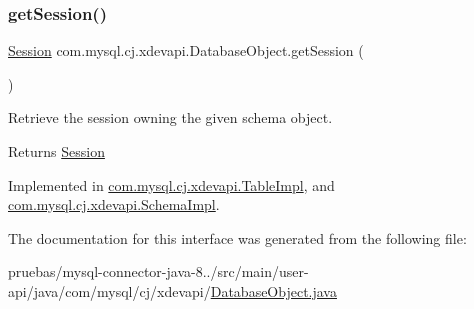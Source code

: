 \mbox{\label{interfacecom_1_1mysql_1_1cj_1_1xdevapi_1_1_database_object_a0bebc7132108a9cfcffed4a599b2dad5}} 
\subsubsection{\texorpdfstring{get\+Session()}{getSession()}}
{\footnotesize\ttfamily \mbox{\hyperlink{interfacecom_1_1mysql_1_1cj_1_1xdevapi_1_1_session}{Session}} com.\+mysql.\+cj.\+xdevapi.\+Database\+Object.\+get\+Session (\begin{DoxyParamCaption}{ }\end{DoxyParamCaption})}

Retrieve the session owning the given schema object.

\begin{DoxyReturn}{Returns}
\mbox{\hyperlink{interfacecom_1_1mysql_1_1cj_1_1xdevapi_1_1_session}{Session}} 
\end{DoxyReturn}


Implemented in \mbox{\hyperlink{classcom_1_1mysql_1_1cj_1_1xdevapi_1_1_table_impl_a50a4a5d8827aef7156fe6aa564f8809a}{com.\+mysql.\+cj.\+xdevapi.\+Table\+Impl}}, and \mbox{\hyperlink{classcom_1_1mysql_1_1cj_1_1xdevapi_1_1_schema_impl_ab09abc096390ec7f763d045636551b7f}{com.\+mysql.\+cj.\+xdevapi.\+Schema\+Impl}}.



The documentation for this interface was generated from the following file\+:\begin{DoxyCompactItemize}
\item 
pruebas/mysql-\/connector-\/java-\/8../src/main/user-\/api/java/com/mysql/cj/xdevapi/\mbox{\hyperlink{_database_object_8java}{Database\+Object.\+java}}\end{DoxyCompactItemize}
